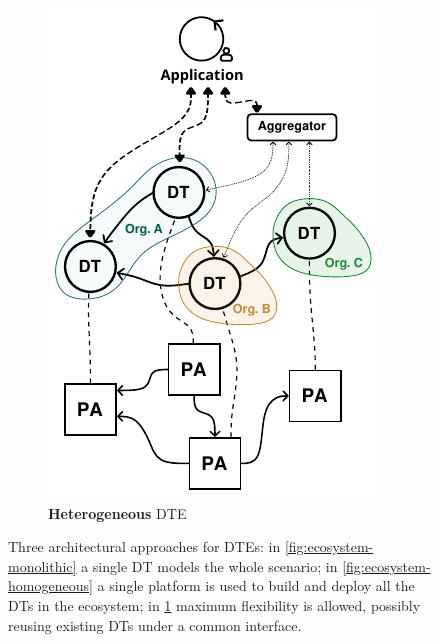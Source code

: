 \begin{figure}[t]
\begin{subfigure}[b]{0.3\linewidth}
        \includegraphics[width=\linewidth]{figures/hwodt/ecosystems_types-heterogeneous.pdf}
        \caption{\textbf{Heterogeneous} \ac{DTE}}
        \label{fig:ecosystem-heterogeneous}
    \end{subfigure}
    \caption{Three architectural approaches for \acp{DTE}: in \ref{fig:ecosystem-monolithic} a single \ac{DT} models the whole scenario; in \ref{fig:ecosystem-homogeneous} a single platform is used to build and deploy all the \acp{DT} in the ecosystem; in \ref{fig:ecosystem-heterogeneous} maximum flexibility is allowed, possibly reusing existing \acp{DT} under a common interface.}
    \label{fig:ecosystem-types}
\end{figure}

